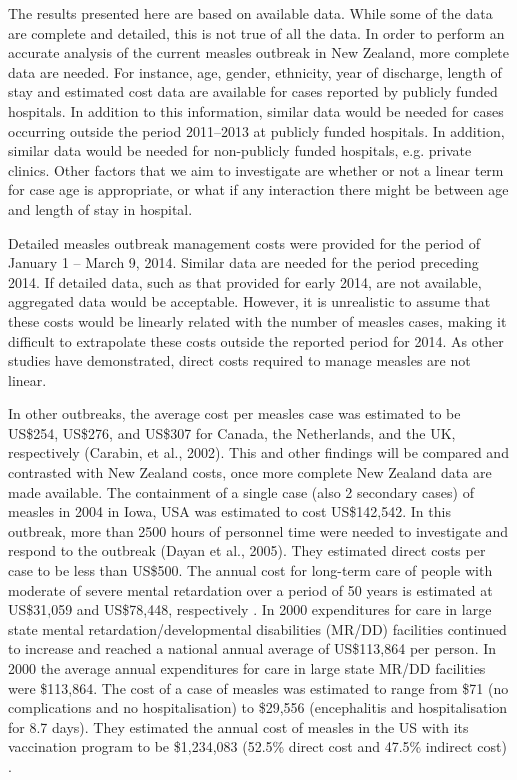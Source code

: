 \documentclass{article}
\begin{document}
The results presented here are based on available data. While some of the data are complete and detailed, this is not true of all the data. In order to perform an accurate analysis of the current measles outbreak in New Zealand, more complete data are needed. For instance, age, gender, ethnicity, year of discharge, length of stay and estimated cost data are available for cases reported by publicly funded hospitals. In addition to this information, similar data would be needed for cases occurring outside the period 2011--2013 at publicly funded hospitals. In addition, similar data would be needed for non-publicly funded hospitals, e.g. private clinics. Other factors that we aim to investigate are whether or not a linear term for case age is appropriate, or what if any interaction there might be between age and length of stay in hospital.

Detailed measles outbreak management costs were provided for the period of January 1 -- March 9, 2014. Similar data are needed for the period preceding 2014. If detailed data, such as that provided for early 2014, are not available, aggregated data would be acceptable. However, it is unrealistic to assume that these costs would be linearly related with the number of measles cases, making it difficult to extrapolate these costs outside the reported period for 2014. As other studies have demonstrated, direct costs required to manage measles are not linear.

In other outbreaks, the average cost per measles case was estimated to be US\$254, US\$276, and US\$307 for Canada, the Netherlands, and the UK, respectively (Carabin, et al., 2002). This and other findings will be compared and contrasted with New Zealand costs, once more complete New Zealand data are made available.
The containment of a single case (also 2 secondary cases) of measles in 2004 in Iowa, USA was estimated to cost US\$142,542. In this outbreak, more than 2500 hours of personnel time were needed to investigate and respond to the outbreak (Dayan et al., 2005). They estimated direct costs per case to be less than US\$500. 
The annual cost for long-term care of people with moderate of severe mental retardation over a period of 50 years is estimated at US\$31,059 and US\$78,448, respectively \citep{prouty1}. In 2000 expenditures for care in large state mental retardation/developmental disabilities (MR/DD) facilities continued to increase and reached a national annual average of US\$113,864 per person. In 2000 the average annual expenditures for care in large state MR/DD facilities were \$113,864. The cost of a case of measles was estimated to range from \$71 (no complications and no hospitalisation) to \$29,556 (encephalitis and hospitalisation for 8.7 days). They estimated the annual cost of measles in the US with its vaccination program to be \$1,234,083 (52.5\% direct cost and 47.5\% indirect cost) \citep{zhou4}.
\end{document}
